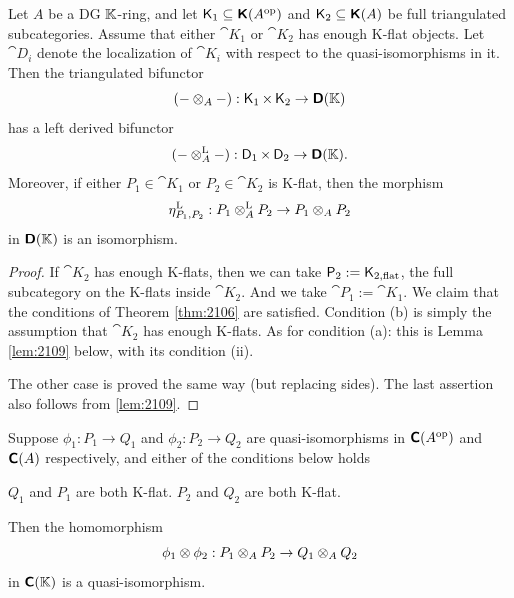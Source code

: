 \begin{thm} \label{thm:2107}
Let $A$ be a DG $\mathbb{K}$-ring, and let 
$\operatorname{\mathsf{K}}_1 \subseteq \boldsymbol{\mathsf{K}}(A^{\mathrm{op}})$
and $\operatorname{\mathsf{K}}_2 \subseteq \boldsymbol{\mathsf{K}}(A)$
be full triangulated subcategories.
Assume that either $\cat{K}_1$ or $\cat{K}_2$ has enough K-flat objects.
Let $\cat{D}_i$ denote the localization of $\cat{K}_i$ with respect to the 
quasi-iso\-morphisms in it. 
Then the triangulated bifunctor 
\[  (- \otimes_A -)  : \operatorname{\mathsf{K}}_1 \times \operatorname{\mathsf{K}}_2 \to \boldsymbol{\mathsf{D}}(\mathbb{K}) \]
has a left derived bifunctor%
\[ (- \otimes^{\mathrm{L}}_A -)  : \operatorname{\mathsf{D}}_1 \times \operatorname{\mathsf{D}}_2 \to \boldsymbol{\mathsf{D}}(\mathbb{K}) . \]
Moreover, if either $P_1 \in \cat{K}_1$ or $P_2 \in \cat{K}_2$ is K-flat, 
then the morphism 
\[ \eta^{\mathrm{L}}_{P_1, P_2} : P_1 \otimes^{\mathrm{L}}_A P_2 \to P_1 \otimes_A P_2 \]
in $\boldsymbol{\mathsf{D}}(\mathbb{K})$ is an isomorphism. 
\end{thm}

\begin{proof}
If $\cat{K}_2$ has enough K-flats, then we can take 
$\operatorname{\mathsf{P}}_2 := \operatorname{\mathsf{K}}_{2, \mathrm{flat}}$, the full subcategory on the 
K-flats inside $\cat{K}_2$. And we take 
$\cat{P}_1 := \cat{K}_{1}$. We claim that the conditions of Theorem 
\ref{thm:2106} are satisfied. Condition 
(b) is simply the assumption that $\cat{K}_2$ has enough K-flats. As for 
condition (a): this is Lemma \ref{lem:2109} below,
with its condition (ii). 

The other case is proved the same way (but replacing sides).  
The last assertion also follows from \ref{lem:2109}.
\end{proof}

\begin{lem}  \label{lem:2109}
Suppose 
$\phi_1 : P_1 \to Q_1$ and $\phi_2 : P_2 \to Q_2$
are quasi-isomorphisms in $\boldsymbol{\mathsf{C}}(A^{\mathrm{op}})$
and $\boldsymbol{\mathsf{C}}(A)$ respectively, and either of the conditions below holds\tup{:}
\begin{enumerate}
 $Q_1$ and $P_1$ are both K-flat.
 $P_2$ and $Q_2$ are both K-flat.
\end{enumerate}
Then the homomorphism
\[ \phi_1 \otimes \phi_2 : P_1 \otimes_A P_2 \to Q_1 \otimes_A Q_2 \]
in $\boldsymbol{\mathsf{C}}(\mathbb{K})$ is a quasi-isomorphism. 
\end{lem}

